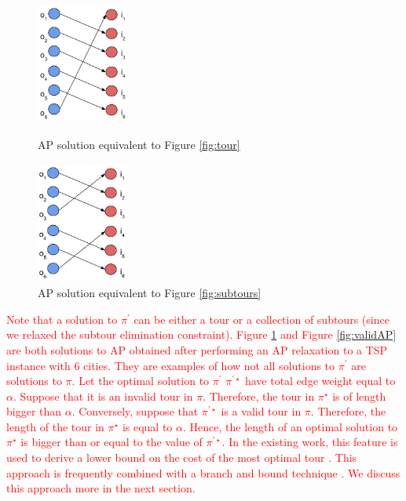\documentclass{mprop}
\theoremstyle{definition}
\begin{document}
\begin{figure}
\centering
\begin{minipage}{.5\textwidth}
\centering
 \includegraphics[width=3cm, height=4cm]{images/validAP.png}
 \caption{AP solution equivalent to Figure \ref{fig:tour}}
 \label{fig:validAP}
\end{minipage}%
\begin{minipage}{.5\textwidth}
\centering
 \includegraphics[width=3cm, height=4cm]{images/invalidAP.png}
 \caption{AP solution equivalent to Figure \ref{fig:subtours}}
 \label{fig:invalidAP}
\end{minipage}
\end{figure}

\textcolor{red}{
Note that a solution to $\pi^{\prime}$ can be either a tour or a collection of subtours (since we relaxed the subtour elimination constraint). Figure \ref{fig:invalidAP} and Figure \ref{fig:validAP} are both solutions to AP obtained after performing an AP relaxation to a TSP instance with 6 cities. They are examples of how not all solutions to $\pi^{\prime}$ are solutions to $\pi$.
Let the optimal solution to $\pi^{\prime}$ $\pi^{\prime\star}$ have total edge weight equal to $\alpha$. Suppose that it is an invalid tour in $\pi$. Therefore, the tour in $\pi^{\star}$ is of length bigger than $\alpha$. Conversely, suppose that $\pi^{\prime\star}$ is a valid tour in $\pi$. Therefore, the length of the tour in $\pi^{\star}$ is equal to $\alpha$. Hence, the length of an optimal solution to $\pi^{\star}$ is bigger than or equal to the value of $\pi^{\prime\star}$.
In the existing work, this feature is used to derive a lower bound on the cost of the most optimal tour \citep{Little63,Dantzig54,Baker83}. This approach is frequently combined with a branch and bound technique \citep{tspbible}. We discuss this approach more in the next section.
}
\end{document}
